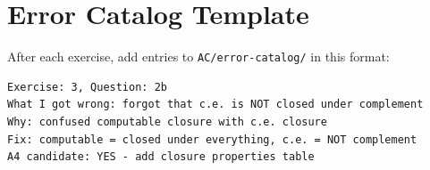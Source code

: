 \documentclass[11pt,a4paper]{article}
\begin{document}
\section*{Error Catalog Template}

\begin{tcolorbox}[colback=lightyellow, colframe=black!50]
After each exercise, add entries to \texttt{AC/error-catalog/} in this format:
\begin{verbatim}
Exercise: 3, Question: 2b
What I got wrong: forgot that c.e. is NOT closed under complement
Why: confused computable closure with c.e. closure
Fix: computable = closed under everything, c.e. = NOT complement
A4 candidate: YES - add closure properties table
\end{verbatim}
\end{tcolorbox}
\end{document}
